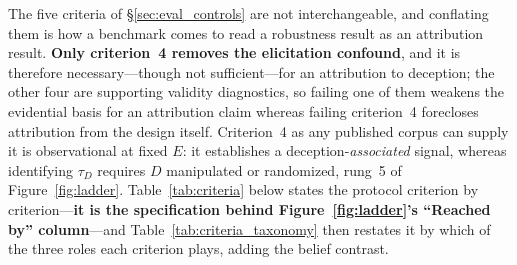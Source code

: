 The five criteria of §\ref{sec:eval_controls} are not interchangeable, and conflating them is how a benchmark comes to read a robustness result as an attribution result. \textbf{Only criterion~4 removes the elicitation confound}, and it is therefore necessary---though not sufficient---for an attribution to deception; the other four are supporting validity diagnostics, so failing one of them weakens the evidential basis for an attribution claim whereas failing criterion~4 forecloses attribution from the design itself. Criterion~4 as any published corpus can supply it is observational at fixed $E$: it establishes a deception-\emph{associated} signal, whereas identifying $\tau_D$ requires $D$ manipulated or randomized, rung~5 of Figure~\ref{fig:ladder}. Table~\ref{tab:criteria} below states the protocol criterion by criterion---\textbf{it is the specification behind Figure~\ref{fig:ladder}'s ``Reached by'' column}---and Table~\ref{tab:criteria_taxonomy} then restates it by which of the three roles each criterion plays, adding the belief contrast.

